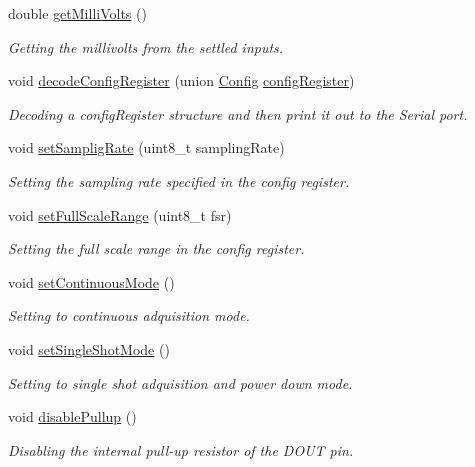 \begin{DoxyCompactItemize}
double \mbox{\hyperlink{class_a_d_s1118_a5d88241e78575ca86f6206f02cec0614}{get\+Milli\+Volts}} ()
\begin{DoxyCompactList}\small\item\em Getting the millivolts from the settled inputs. \end{DoxyCompactList}\item 
void \mbox{\hyperlink{class_a_d_s1118_a8d79b157a07574bd8745137a8347649e}{decode\+Config\+Register}} (union \mbox{\hyperlink{union_config}{Config}} \mbox{\hyperlink{class_a_d_s1118_ab41e0ba159527f2fc8d48cbedc653380}{config\+Register}})
\begin{DoxyCompactList}\small\item\em Decoding a config\+Register structure and then print it out to the Serial port. \end{DoxyCompactList}\item 
void \mbox{\hyperlink{class_a_d_s1118_abcabaf741cc3e45e53a6967e0d113073}{set\+Samplig\+Rate}} (uint8\+\_\+t sampling\+Rate)
\begin{DoxyCompactList}\small\item\em Setting the sampling rate specified in the config register. \end{DoxyCompactList}\item 
void \mbox{\hyperlink{class_a_d_s1118_a15fcd99b88c988fef9b4cc04347b08a5}{set\+Full\+Scale\+Range}} (uint8\+\_\+t fsr)
\begin{DoxyCompactList}\small\item\em Setting the full scale range in the config register. \end{DoxyCompactList}\item 
void \mbox{\hyperlink{class_a_d_s1118_af739fb00547d7a5df8c5010c40b64c6a}{set\+Continuous\+Mode}} ()
\begin{DoxyCompactList}\small\item\em Setting to continuous adquisition mode. \end{DoxyCompactList}\item 
void \mbox{\hyperlink{class_a_d_s1118_a9e2e456dee0ee957fe89319d12bd833c}{set\+Single\+Shot\+Mode}} ()
\begin{DoxyCompactList}\small\item\em Setting to single shot adquisition and power down mode. \end{DoxyCompactList}\item 
void \mbox{\hyperlink{class_a_d_s1118_a649c53bdf46a93b5ab682d04b9f9df5e}{disable\+Pullup}} ()
\begin{DoxyCompactList}\small\item\em Disabling the internal pull-\/up resistor of the D\+O\+UT pin. \end{DoxyCompactList}\item 

\end{DoxyCompactItemize}
